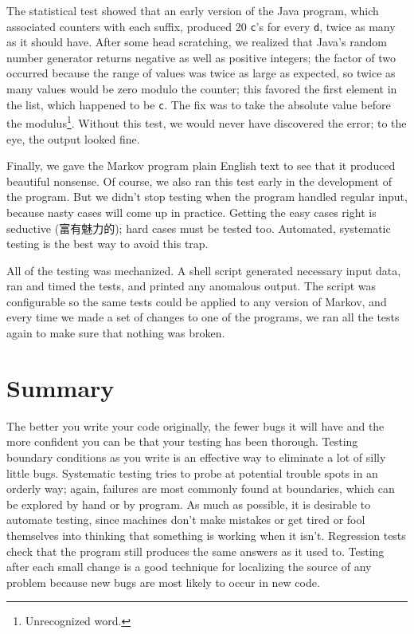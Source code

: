 The statistical test showed that an early version of the Java program,
which associated counters with each suffix, produced 20 \texttt{c}'s for
every \texttt{d}, twice as many as it should have. After some head
scratching, we realized that Java's random number generator returns
negative as well as positive integers; the factor of two occurred because
the range of values was twice as large as expected, so twice as many values
would be zero modulo the counter; this favored the first element in the
list, which happened to be \verb'c'.  The fix was to take the absolute
value before the modulus\footnote{Unrecognized word.}. Without this test,
we would never have discovered the error; to the eye, the output looked
fine.

Finally, we gave the Markov program plain English text to see that it
produced beautiful nonsense. Of course, we also ran this test early in the
development of the program. But we didn't stop testing when the program
handled regular input, because nasty cases will come up in practice.
Getting the easy cases right is seductive (富有魅力的); hard cases must be
tested too. Automated, systematic testing is the best way to avoid this
trap.

All of the testing was mechanized. A shell script generated necessary input
data, ran and timed the tests, and printed any anomalous output. The script
was configurable so the same tests could be applied to any version of
Markov, and every time we made a set of changes to one of the programs, we
ran all the tests again to make sure that nothing was broken.

\section{Summary}

The better you write your code originally, the fewer bugs it will have and
the more confident you can be that your testing has been thorough. Testing
boundary conditions as you write is an effective way to eliminate a lot of
silly little bugs. Systematic testing tries to probe at potential trouble
spots in an orderly way; again, failures are most commonly found at
boundaries, which can be explored by hand or by program.  As much as
possible, it is desirable to automate testing, since machines don't make
mistakes or get tired or fool themselves into thinking that something is
working when it isn't. Regression tests check that the program still
produces the same answers as it used to. Testing after each small change is
a good technique for localizing the source of any problem because new bugs
are most likely to occur in new code.

